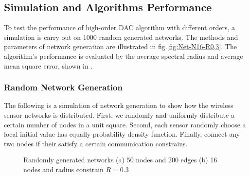 \subsection{Simulation and Algorithms Performance}

To test the performance of high-order DAC algorithm with different
orders, a simulation is carry out on 1000 random generated networks.
The methods and parameters of network generation are illustrated in
fig.\ref{fig:Net-N16-R0,3}. The algorithm's performance is evaluated
by the average spectral radius and average mean square error, shown
in . 


\subsubsection{Random Network Generation}

The following is a simulation of network generation to show how the
wireless sensor networks is distributed. First, we randomly and uniformly
distribute a certain number of nodes in a unit square. Second, each
sensor randomly choose a local initial value has equally probability
density function. Finally, connect any two nodes if their satisfy
a certain communication constrains. 

\begin{figure}[h]
\hfill{}\hfill{}\hfill{}\caption{\label{fig:Random-Network}Randomly generated networks (a) 50 nodes
and 200 edges (b) 16 nodes and radius constrain $R=0.3$}
\end{figure}


